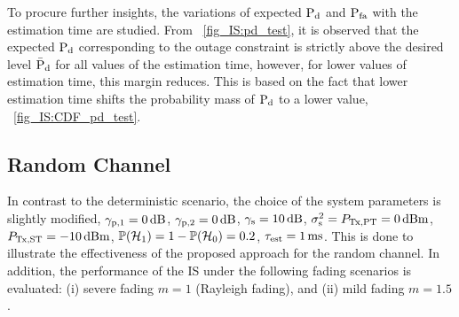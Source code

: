 {To procure further insights, the variations of expected $\text{P}_{\text{d}}$ and $\text{P}_{\text{fa}}$ with the estimation time are studied. From \figurename~\ref{fig_IS:pd_test}, it is observed that the expected $\text{P}_{\text{d}}$ corresponding to the outage constraint is strictly above the desired level $\bar{\text{P}}_{\text{d}}$ for all values of the estimation time, however, for lower values of estimation time, this margin reduces. This is based on the fact that lower estimation time shifts the probability mass of $\text{P}_{\text{d}}$ to a lower value,  \figurename~\ref{fig_IS:CDF_pd_test}. %

\subsection{Random Channel} %
In contrast to the deterministic scenario, the choice of the system parameters is slightly modified, ${\gamma}_{\text{p,1}} = \SI{0}{dB}$, ${\gamma}_{\text{p,2}} = \SI{0}{dB}$, ${\gamma}_{\text{s}} = \SI{10}{dB}$, $\sigma^2_{\text{s}} = P_{\text{Tx,PT}} = \SI{0}{dBm}$, $P_{\text{Tx,ST}} = -\SI{10}{dBm}$, $\mathbb P(\mathcal{H}_1) = 1 - \mathbb P(\mathcal{H}_0) = 0.2$, $\tau_{\text{est}} = \SI{1}{ms}$. This is done to illustrate the effectiveness of the proposed approach for the random channel. In addition, the performance of the IS under the following fading scenarios is evaluated: (i) severe fading $m = 1$ (Rayleigh fading), and (ii) mild fading $m = 1.5$. 

}

